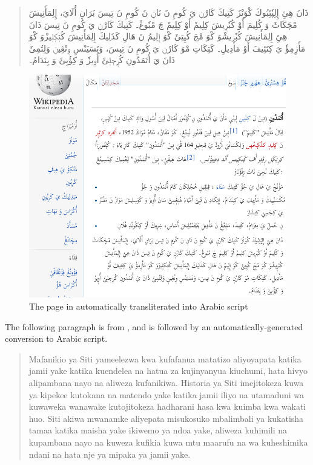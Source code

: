 \begin{quotation}
\begin{Arabic}
ذَانَ هِئِ إِلِپٗئِبُوكَ كْوَنْزَ كَتِيكَ كَارْنٖ يَ كُومِ نَ نَانٖ نَ كُومِ نَ تِيسَ بَرَانِ أُلَايَ، إِلِمَأَنِيشَ مْچَكَاتٗ وَ كُلِيمَ أَوْ كُبٗرٖيشَ كِلِيمٗ أَوْ كِلِيمٗ چَ مْبٗوڠَ۔ كَتِيكَ كَارْنٖ يَ كُومِ نَ تِيسَ ذَانَ هِئِ إِلِمَأَنِيشَ كُبٗرٖيشْوَ كْوَ مْجَ كُپِتِئَ كْوَ إٖلِيمُ نَ هَالِ كَذَلِيكَ إِلِمَأَنِيشَ كُتٖكٖلٖيزْوَ كْوَ مَأَزِمِؤٗ يَ كِتَئِيفَ أَوْ مَأَدِيلِ۔ كَتِكَاتِ مْوَ كَارْنٖ يَ كُومِ نَ تِيسَ، وَنَسَيَنْسِ وٖنْڠِينٖ وَلِتُمِئَ ذَانَ يَ أُتَمَدُونِ كُرٖجٖلٖئَ أُوٖيزٗ وَ كِؤُبِئَ وَ بِنَدَامُ۔
\end{Arabic}
\end{quotation}

\begin{figure}[H]
\centering
\includegraphics[keepaspectratio=true, scale=0.8]{./images/utamaduni-ar.png}
\caption{The page in  automatically transliterated into Arabic script}
\label{fig:wikiA}
\end{figure}

The following paragraph is from \citet{Hamad2011}, and is followed by an automatically-generated conversion to Arabic script.

\begin{quotation}
Mafanikio ya Siti yameelezwa kwa kufafanua matatizo aliyoyapata katika jamii yake katika kuendelea na hatua za kujinyanyua kiuchumi, hata hivyo alipambana nayo na aliweza kufanikiwa. Historia ya Siti imejitokeza kuwa ya kipekee kutokana na matendo yake katika jamii iliyo na utamaduni wa kuwaweka wanawake kutojitokeza hadharani hasa kwa kuimba kwa wakati huo. Siti akiwa mwanamke aliyepata misukosuko mbalimbali ya kukatisha tamaa katika maisha yake ikiwemo ya ndoa yake, aliweza kuhimili na kupambana nayo na kuweza kufikia kuwa mtu maarufu na wa kuheshimika ndani na hata nje ya mipaka ya jamii yake.
\end{quotation}

